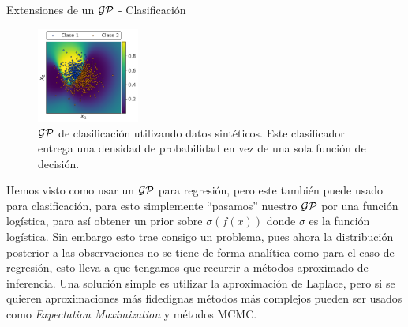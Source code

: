 \documentclass[handout, 9pt]{beamer}
\begin{document}
\begin{frame}{Extensiones de un $\mathcal{GP}$ - Clasificación}
    \begin{figure}
        \centering
        \includegraphics[width=0.3\textwidth]{../img/cap8_classificacion}
        \caption{$\mathcal{GP}$ de clasificación utilizando datos sintéticos. Este clasificador entrega una densidad de probabilidad en vez de una sola función de decisión.}\label{fig:gp_8}
        \end{figure} 
        
        Hemos visto como usar un $\mathcal{GP}$ para regresión, pero este también puede usado para clasificación, para esto simplemente ``pasamos'' nuestro $\mathcal{GP}$ por una función logística, para así obtener un prior sobre $\sigma\left(f(x)\right)$ donde $\sigma$ es la función logística. Sin embargo esto trae consigo un problema, pues ahora la distribución posterior a las observaciones no se tiene de forma analítica como para el caso de regresión, esto lleva a que tengamos que recurrir a métodos aproximado de inferencia. Una solución simple es utilizar la aproximación de Laplace, pero si se quieren aproximaciones más fidedignas métodos más complejos pueden ser usados como \textit{Expectation Maximization} y métodos MCMC.
    
\end{frame}
\end{document}
